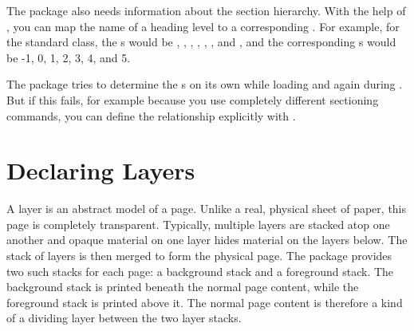 The  package also needs information about the section
hierarchy. With the help of , you can map the
name of a heading level to a corresponding . For example,
for the standard  class, the s would be
, , , ,
, , and , and the
corresponding s would be -1, 0, 1, 2, 3, 4, and 5.

The  package tries to determine the s on
its own while loading and again during . But
if this fails, for example because you use completely different sectioning
commands, you can define the relationship explicitly with
.%
\EndIndexGroup


\section{Declaring Layers}

A layer is an abstract model of a page. Unlike a real, physical sheet of
paper, this page is completely transparent. Typically, multiple layers are
stacked atop one another and opaque material on one layer hides material on
the layers below. The stack of layers is then merged to form the physical
page. The  package provides two such stacks for each page: a
background stack and a foreground stack. The background stack is printed
beneath the normal page content, while the foreground stack is printed above
it. The normal page content is therefore a kind of a dividing layer between
the two layer stacks.

